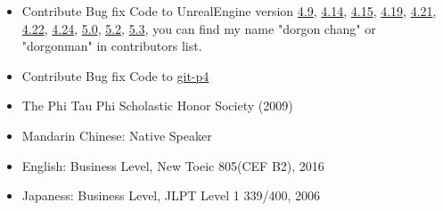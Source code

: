 \documentclass[a4paper,12pt]{memoir} %
\begin{document}
{\begin{itemize}
    \item Contribute Bug fix Code to UnrealEngine version 
    \href{https://www.unrealengine.com/en-US/blog/unreal-engine-49-released}{4.9}, 
    \href{https://www.unrealengine.com/en-US/blog/unreal-engine-4-14-released}{4.14}, 
    \href{https://www.unrealengine.com/en-US/blog/unreal-engine-4-15-released}{4.15},  
    \href{https://www.unrealengine.com/en-US/blog/unreal-engine-4-19-released}{4.19}, 
    \href{https://www.unrealengine.com/en-US/blog/unreal-engine-4-21-released}{4.21}, 
    \href{https://www.unrealengine.com/en-US/blog/unreal-engine-4-22-released}{4.22}, 
    \href{https://docs.unrealengine.com/latest/INT/Support/Builds/ReleaseNotes/4_24/}{4.24}, 
    \href{https://docs.unrealengine.com/5.0/en-US/unreal-engine-5-0-release-notes/}{5.0},
    \href{https://docs.unrealengine.com/5.2/en-US/unreal-engine-5.2-release-notes/}{5.2},
    \href{https://docs.unrealengine.com/5.3/en-US/unreal-engine-5.3-release-notes/}{5.3}, you can find my name "dorgon chang" or "dorgonman" in contributors list. \\


    \item Contribute Bug fix Code to 
    \href{https://github.com/git/git/pull/977}{git-p4} 

  \end{itemize}

}

\Sep %
\Sep %
\Sep %



\begin{itemize}
  \item The Phi Tau Phi Scholastic Honor Society (2009)
\end{itemize}


\Sep %
\Sep %
\Sep %

\begin{itemize}
  \item Mandarin Chinese: Native Speaker
  \item English: Business Level, New Toeic 805(CEF B2), 2016
  \item Japaness: Business Level, JLPT Level 1 339/400, 2006
\end{itemize}


\Sep %
\Sep %
\Sep %
\end{document}
